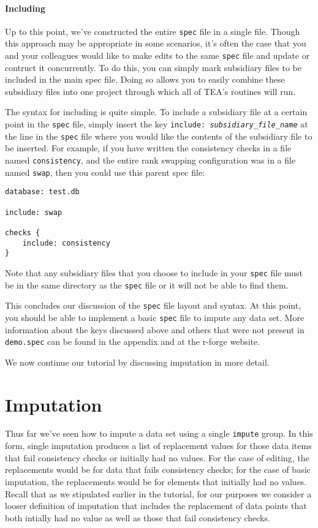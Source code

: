 \documentclass{article}
\begin{document}
\paragraph{Including} Up to this point, we've constructed the entire {\tt spec} file in a single file. 
Though this approach may 
be appropriate in some scenarios, it's often the case that you and your colleagues would like to make 
edits to the same {\tt spec} file and update or contruct it concurrently. To do this, you can simply mark 
subsidiary files to be included in the main spec file. Doing so allows you to easily combine these 
subsidiary files into one project through which all of TEA's routines will run.

The syntax for including is quite simple. To include a subsidiary file at a certain point in the {\tt spec} 
file, simply insert the key {\tt include: \textit{subsidiary\_file\_name}} at the line in the {\tt spec} 
file where you would like the contents of the subsidiary file to be inserted. For example, if you have 
written the consistency checks in a file named {\tt consistency}, and the entire rank swapping 
configuration was in a file named {\tt swap}, then you could use this parent spec file:

\begin{verbatim}
database: test.db

include: swap

checks {
    include: consistency
}
\end{verbatim}

Note that any subsidiary files that you choose to include in your {\tt spec} file must be in the same 
directory as the {\tt spec} file or it will not be able to find them.

This concludes our discussion of the {\tt spec} file layout and syntax. At this point, you should be 
able to implement a basic {\tt spec} file to impute any data set. More information about the keys 
discussed above and others that were not present in {\tt demo.spec} can be found in the appendix and 
at the r-forge website.

We now continue our tutorial by discussing imputation in more detail.

\section{Imputation}
Thus far we've seen how to impute a data set using a single {\tt impute} group. In this form, single 
imputation produces a list of replacement values for those data items that fail consistency checks 
or initially had no values. For the case of editing, the replacements would be for data that fails 
consistency checks; for the case of basic imputation, the replacements would be for elements that
initially had no values. Recall that as we stipulated earlier in the tutorial, for our purposes we 
consider a looser definition of imputation that includes the replacement of data points that both 
intially had no value as well as those that fail consistency checks.
\end{document}
